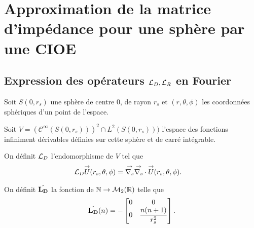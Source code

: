 \section{Approximation de la matrice d'impédance pour une sphère par une CIOE}

  \subsection[Expression des opérateurs LD,LR en Fourier]{Expression des opérateurs \({\mathcal{L}_D},{\mathcal{L}_R}\) en Fourier}


Soit \(S(0,r_s)\) une sphère de centre 0, de rayon \(r_s\) et \((r,\theta,\phi)\) les coordonnées sphériques d'un point de l'espace.

    Soit \(V = \left(\mathcal{C}^\infty(S(0,r_s))\right)^2 \cap L^2(S(0,r_s)))\) l'espace des fonctions infiniment dérivables définies sur cette sphère et de carré intégrable.

    \begin{defn}
      \label{eq:sphere:fourier:LD}
      On définit \({\mathcal{L}_D}\) l'endomorphisme de \(V\) tel que
      \begin{align*}
        {\mathcal{L}_D} {\overset{\rightarrow}{U}}(r_s,\theta,\phi) & = {\overset{\rightarrow}{\nabla_s}}{} {\overset{\rightarrow}{\nabla_s}} \cdot{} {\overset{\rightarrow}{U}}(r_s,\theta,\phi).
      \end{align*}

      On définit \(\hat{\mathbf{L_D}}\) la fonction de \(\mathbb N \rightarrow \mathcal{M}_2(\mathbb R)\) telle que
      \begin{equation*}
        \hat{\mathbf{L_D}}(n) = -
        \begin{bmatrix}
          0 & 0
          \\
          0 & \dfrac{n(n+1)}{r_s^2}
        \end{bmatrix}.
      \end{equation*}
    \end{defn}

